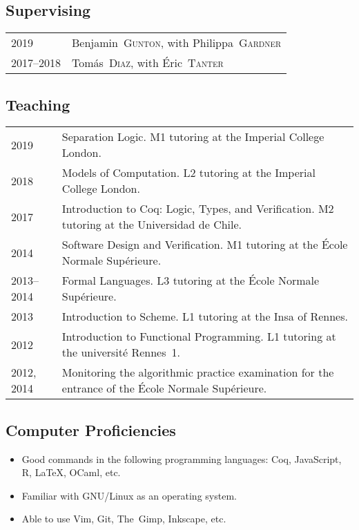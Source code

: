 \documentclass[12pt,a4paper]{article}
\makeatletter
\newcommand{\fr}[1]{\foreignlanguage{french}{{#1}}}
\newcommand{\es}[1]{\foreignlanguage{spanish}{{#1}}}
\newcommand{\fr}[1]{\foreignlanguage{francais}{{#1}}}
\newcommand{\es}[1]{\foreignlanguage{spanish}{{#1}}}
\newenvironment{datecvsection}[1]%
               {\subsection*{#1}%
                 \noindent \begin{tabular}{@{}p{\annee}p{\texte}@{}}}
               {\end{tabular}}
\newenvironment{itemcvsection}[1]%
               {\subsection*{#1}\begin{itemize}}
               {\end{itemize}}
\newcommand\familyName{\textsc}
\newcommand\placeName{}
\makeatother
\begin{document}
\begin{datecvsection}{Supervising}

    2019 & Benjamin~\familyName{Gunton}, with Philippa~\familyName{Gardner} \\
    2017–2018 & Tomás~\familyName{Diaz}, with Éric~\familyName{Tanter} \\

\end{datecvsection}

\begin{datecvsection}{Teaching}

    2019 & Separation Logic. M1 tutoring at the Imperial College London. \\

    2018 & Models of Computation. L2 tutoring at the Imperial College London. \\

    2017 & Introduction to Coq: Logic, Types, and Verification. M2 tutoring at the \es{\placeName{Universidad de Chile}}. \\

    2014 & Software Design and Verification. M1 tutoring at the \fr{\placeName{École Normale Supérieure}}. \\

    2013–2014 & Formal Languages. L3 tutoring at the \fr{\placeName{École Normale Supérieure}}. \\

    2013 & Introduction to Scheme. L1 tutoring at the \placeName{Insa} of \placeName{Rennes}. \\

    2012 & Introduction to Functional Programming. L1 tutoring at the \fr{université \placeName{Rennes}~1}. \\

    2012, 2014 & Monitoring the algorithmic practice examination for the entrance of the \fr{\placeName{École Normale Supérieure}}. \\

\end{datecvsection}

\begin{itemcvsection}{Computer Proficiencies}

	\item Good commands in the following programming languages:  Coq, JavaScript, R, \LaTeX, OCaml, etc.
	\item Familiar with GNU/Linux as an operating system.
	\item Able to use Vim, Git, The~Gimp, Inkscape, etc.

\end{itemcvsection}
\end{document}
